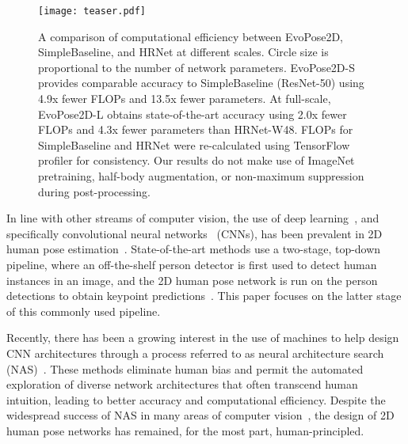 \documentclass[final]{cvpr}
\begin{document}
\begin{figure}
\centering
    \texttt{[image: teaser.pdf]}
\caption{A comparison of computational efficiency between EvoPose2D, SimpleBaseline, and HRNet at different scales. Circle size is proportional to the number of network parameters. EvoPose2D-S provides comparable accuracy to SimpleBaseline (ResNet-50) using 4.9x fewer FLOPs and 13.5x fewer parameters. At full-scale, EvoPose2D-L obtains state-of-the-art accuracy using 2.0x fewer FLOPs and 4.3x fewer parameters than HRNet-W48. FLOPs for SimpleBaseline and HRNet were re-calculated using TensorFlow profiler for consistency. Our results do not make use of ImageNet pretraining, half-body augmentation, or non-maximum suppression during post-processing.}
\label{fig:teaser}
\end{figure}

In line with other streams of computer vision, the use of deep learning~\cite{lecun2015deep}, and specifically convolutional neural networks~\cite{lecun1995convolutional} (CNNs), has been prevalent in 2D human pose estimation~\cite{toshev2014deeppose, tompson2014joint, newell2016stacked, cao2017realtime, chen2018cascaded, xiao2018simple, sun2019deep}. State-of-the-art methods use a two-stage, top-down pipeline, where an off-the-shelf person detector is first used to detect human instances in an image, and the 2D human pose network is run on the person detections to obtain keypoint predictions~\cite{chen2018cascaded, xiao2018simple, sun2019deep}. This paper focuses on the latter stage of this commonly used pipeline. 

Recently, there has been a growing interest in the use of machines to help design CNN architectures through a process referred to as neural architecture search (NAS)~\cite{zoph2017neural, baker2016designing, wistuba2019survey}. These methods eliminate human bias and permit the automated exploration of diverse network architectures that often transcend human intuition, leading to better accuracy and computational efficiency. Despite the widespread success of NAS in many areas of computer vision~\cite{tan2019efficientnet, chen2018searching, liu2019auto, ghiasi2019fpn, nekrasov2019fast, zhu2019v}, the design of 2D human pose networks has remained, for the most part, human-principled. 
\end{document}
